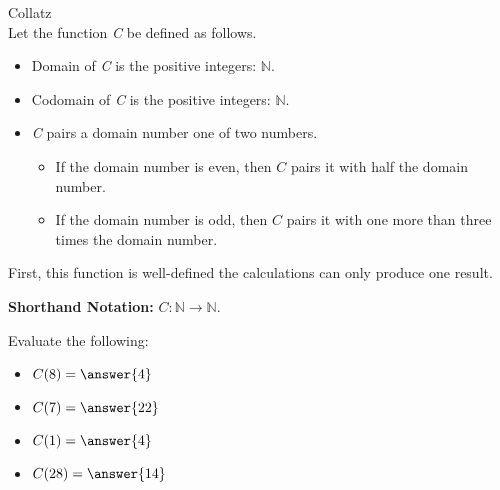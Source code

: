 \documentclass{ximera}
\begin{document}
\begin{example} Collatz \\

Let the function \textit{C} be defined as follows.


\begin{itemize}
\item Domain of \textit{C} is the positive integers: $\mathbb{N}$.
\item Codomain of \textit{C} is the positive integers: $\mathbb{N}$.
\item \textit{C} pairs a domain number one of two numbers.
	\begin{itemize}
			\item If the domain number is even, then $C$ pairs it with half the domain number.
			\item If the domain number is odd, then $C$ pairs it with one more than three times the domain number.
	\end{itemize}
\end{itemize}


First, this function is well-defined the calculations can only produce one result.


\textbf{Shorthand Notation: } $C: \mathbb{N} \rightarrow \mathbb{N}$.

\begin{question}
Evaluate the following:

\begin{itemize}
	\item $C(8) = \answer{4}$
	\item $C(7) = \answer{22}$
	\item $C(1) = \answer{4}$
	\item $C(28) = \answer{14}$
\end{itemize}

\end{question}

\end{example}
\end{document}

